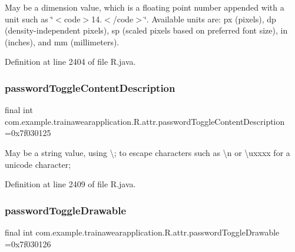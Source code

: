 May be a dimension value, which is a floating point number appended with a unit such as \char`\"{}$<$code$>$14.\+5sp$<$/code$>$\char`\"{}. Available units are\+: px (pixels), dp (density-\/independent pixels), sp (scaled pixels based on preferred font size), in (inches), and mm (millimeters). 

Definition at line 2404 of file R.\+java.

\mbox{\label{classcom_1_1example_1_1trainawearapplication_1_1_r_1_1attr_a5923a25b48bb17ee0244d9ffd0fd0d85}} 
\subsubsection{\texorpdfstring{passwordToggleContentDescription}{passwordToggleContentDescription}}
{\footnotesize\ttfamily final int com.\+example.\+trainawearapplication.\+R.\+attr.\+password\+Toggle\+Content\+Description =0x7f030125\hspace{0.3cm}{\ttfamily [static]}}

May be a string value, using \textquotesingle{}\textbackslash{};\textquotesingle{} to escape characters such as \textquotesingle{}\textbackslash{}n\textquotesingle{} or \textquotesingle{}\textbackslash{}uxxxx\textquotesingle{} for a unicode character; 

Definition at line 2409 of file R.\+java.

\mbox{\label{classcom_1_1example_1_1trainawearapplication_1_1_r_1_1attr_afbb0722c6966ebc5fddb5e4b00d10d80}} 
\subsubsection{\texorpdfstring{passwordToggleDrawable}{passwordToggleDrawable}}
{\footnotesize\ttfamily final int com.\+example.\+trainawearapplication.\+R.\+attr.\+password\+Toggle\+Drawable =0x7f030126\hspace{0.3cm}{\ttfamily [static]}}

